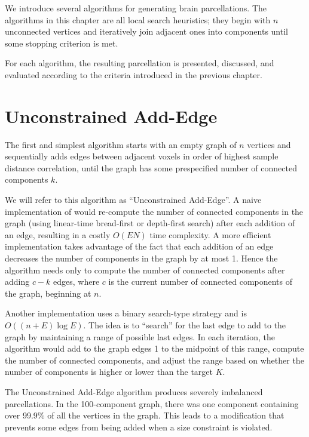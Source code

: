 
We introduce several algorithms for generating brain parcellations. The
algorithms in this chapter are all local search heuristics; they begin
with $n$ unconnected vertices and iteratively join adjacent ones into
components until some stopping criterion is met.

For each algorithm, the resulting parcellation is presented, discussed,
and evaluated according to the criteria introduced in the previous
chapter.

\section{Unconstrained Add-Edge}

The first and simplest algorithm starts with an empty graph of $n$
vertices and sequentially adds edges between adjacent voxels in order of
highest sample distance correlation, until the graph has some
prespecified number of connected components $k$.

We will refer to this algorithm as ``Unconstrained Add-Edge''. A naive
implementation of would re-compute the number of connected components in
the graph (using linear-time bread-first or depth-first search) after
each addition of an edge, resulting in a costly $O(EN)$ time complexity.
A more efficient implementation takes advantage of the fact that each
addition of an edge decreases the number of components in the graph by
at most 1. Hence the algorithm needs only to compute the number of
connected components after adding $c - k$ edges, where $c$ is the
current number of connected components of the graph, beginning at $n$.

Another implementation uses a binary search-type strategy and is
$O((n + E) \log E)$. The idea is to ``search'' for the last edge to add
to the graph by maintaining a range of possible last edges. In each
iteration, the algorithm would add to the graph edges 1 to the midpoint
of this range, compute the number of connected components, and adjust
the range based on whether the number of components is higher or lower
than the target $K$.

The Unconstrained Add-Edge algorithm produces severely imbalanced
parcellations. In the 100-component graph, there was one component
containing over 99.9\% of all the vertices in the graph. This leads
to a modification that prevents some edges from being added when a
size constraint is violated.

